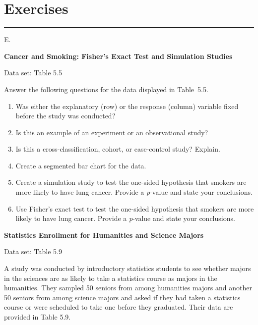 \documentclass[
]{report}
\newcounter{excount}
\renewcommand{\theexcount}{E\arabic{excount}}
\begin{document}
\hypertarget{exercises-4}{%
\section*{\texorpdfstring{\textbf{Exercises}}{Exercises}}\label{exercises-4}}

\vspace{-2em}

\noindent

\rule{\linewidth}{0.4pt}

\setcounter{excount}{0}

\begin{list}{\theexcount.}{ \setlength{\itemsep}{0.5em}}

  \item \textbf{Cancer and Smoking: Fisher’s Exact Test and Simulation Studies}    

  Data set: Table 5.5    

  Answer the following questions for the data displayed in Table 5.5.  
  \begin{enumerate}
    \item Was either the explanatory (row) or the response (column) variable fixed before the study was conducted?
    \item Is this an example of an experiment or an observational study?
    \item Is this a cross-classification, cohort, or case-control study? Explain.
    \item Create a segmented bar chart for the data.
    \item Create a simulation study to test the one-sided hypothesis that smokers are more likely to have lung cancer. Provide a \textit{p}-value and state your conclusions.
    \item Use Fisher’s exact test to test the one-sided hypothesis that smokers are more likely to have lung cancer. Provide a \textit{p}-value and state your conclusions.
  \end{enumerate}

  \item \textbf{Statistics Enrollment for Humanities and Science Majors}    

  Data set: Table 5.9    

  A study was conducted by introductory statistics students to see whether majors in the sciences are as likely to take a statistics course as majors in the humanities. They sampled 50 seniors from among humanities majors and another 50 seniors from among science majors and asked if they had taken a statistics course or were scheduled to take one before they graduated. Their data are provided in Table 5.9.  
  

\end{list}
\end{document}
